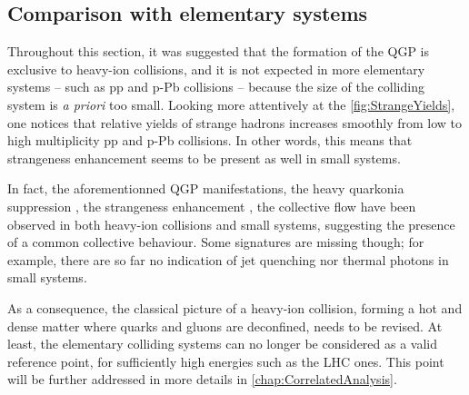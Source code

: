 \subsection{Comparison with elementary systems}
\label{subsec:ComparisonPP}

Throughout this section, it was suggested that the formation of the QGP is exclusive to heavy-ion collisions, and it is not expected in more elementary systems -- such as pp and p-Pb collisions -- because the size of the colliding system is \textit{a priori} too small. Looking more attentively at the \fig\ref{fig:StrangeYields}, one notices that relative yields of strange hadrons increases smoothly from low to high multiplicity pp and p-Pb collisions. In other words, this means that strangeness enhancement seems to be present as well in small systems.

In fact, the aforementionned QGP manifestations, the heavy quarkonia suppression \cite{adamCentralityDependence2S2016}, the strangeness enhancement \cite{alicecollaborationALICEExperimentJourney2022}, the collective flow \cite{schotterQCDLHC2022} have been observed in both heavy-ion collisions and small systems, suggesting the presence of a common collective behaviour. Some signatures are missing though; for example, there are so far no indication of jet quenching nor thermal photons in small systems. 

As a consequence, the classical picture of a heavy-ion collision, forming a hot and dense matter where quarks and gluons are deconfined, needs to be revised. At least, the elementary colliding systems can no longer be considered as a valid reference point, for sufficiently high energies such as the LHC ones. This point will be further addressed in more details in \chap\ref{chap:CorrelatedAnalysis}.



